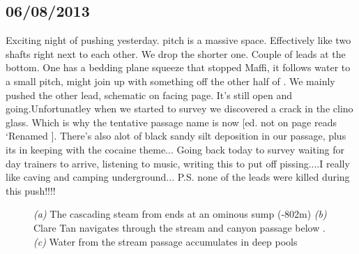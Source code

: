 \subsection{06/08/2013}
Exciting night of pushing yesterday.  pitch is a massive space. Effectively like two shafts right next to each other. We drop the shorter one. Couple of leads at the bottom. One has a bedding plane squeeze that stopped Maffi, it follows water to a small pitch, might join up with something off the other half of .
We mainly pushed the other lead, schematic on facing page. It's still open and going.Unfortunatley when we started to survey we discovered a crack in the clino glass. Which is why the tentative passage name is now  [ed. not on page reads `Renamed ]. There's also alot of black sandy silt deposition in our passage, plus its in keeping with the cocaine theme...
Going back today to survey waiting for day trainers to arrive, listening to music, writing this to put off pissing....I really like caving and camping underground...
P.S. none of the leads were killed during this push!!!!

\begin{figure}[t!]
      \checkoddpage \ifoddpage \forcerectofloat \else \forceversofloat \fi
      \centering
    \begin{subfigure}[t]{\textwidth}
    \centering
        \caption{} \label{lethe sifon 2}
    \end{subfigure}
    
          \vspace{0.3cm}
          
    \begin{subfigure}[t]{0.555\textwidth}
        \centering
        \caption{} \label{clare in lethe}
    \end{subfigure}
    \hfill
    \begin{subfigure}[t]{0.418\textwidth}
        \centering
        \caption{} \label{lethe canyon}
    \end{subfigure}

    \caption{
    \emph{(a)} The cascading steam from \protect{} ends at an ominous sump (-802m)
    \emph{(b)} Clare Tan navigates through the stream and canyon passage below \protect{}.
    \emph{(c)} Water from the stream passage accumulates in deep pools }
\end{figure}

